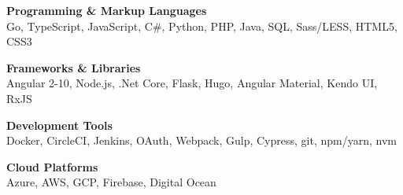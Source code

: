 

\begin{cvparagraph}

    \textbf{Programming \& Markup Languages}\\
    Go, TypeScript, JavaScript, C\#, Python, PHP, Java, SQL, Sass/LESS, HTML5, CSS3

    \textbf{Frameworks \& Libraries}\\
    Angular 2-10, Node.js, .Net Core, Flask, Hugo, Angular Material, Kendo UI, RxJS

    \textbf{Development Tools}\\
    Docker, CircleCI, Jenkins, OAuth, Webpack, Gulp, Cypress, git, npm/yarn, nvm

    \textbf{Cloud Platforms}\\
    Azure, AWS, GCP, Firebase, Digital Ocean
\end{cvparagraph}
